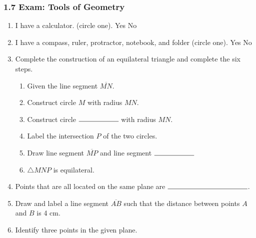 \documentclass[12pt, twoside]{article}
\begin{document}
  \subsubsection*{1.7 Exam: Tools of Geometry}
    \vspace{0.5cm}
\begin{enumerate}

  \item I have a calculator. (circle one). Yes \qquad No
  \item I have a compass, ruler, protractor, notebook, and folder (circle one). Yes \qquad No
\vspace{0.5cm}
  \item Complete the construction of an equilateral triangle and complete the six steps.
  \begin{enumerate}
    \item Given the line segment $\overline{MN}$.
    \bigskip
    \item Construct circle $M$ with radius $MN$.
    \bigskip
    \item Construct circle $\rule{2cm}{0.15mm}$  with radius $MN$. \bigskip
    \item Label the intersection $P$ of the two circles.
    \bigskip
    \item Draw line segment $\overline{MP}$ and line segment $\rule{2cm}{0.15mm}$
    \bigskip
    \item $\triangle MNP$ is equilateral.
  \end{enumerate}
  \vspace{7cm}
  \begin{center}
  \end{center}

\newpage
  \item Points that are all located on the same plane are $\rule{4cm}{0.15mm}$.\bigskip

  \item Draw and label a line segment $\overline{AB}$ such that the distance between points $A$ and $B$ is 4 cm. 
  \vspace{3cm}

  \item Identify three points in the given plane.\\[0.25in]
     \vspace{1cm}


\end{enumerate}
\end{document}
